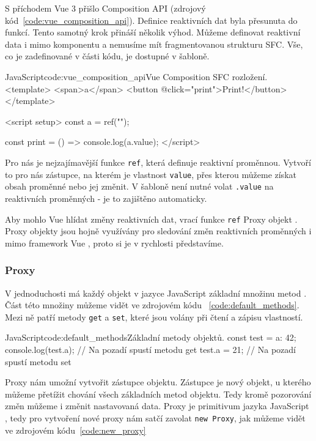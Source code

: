 \documentclass[
  master,
  program=ainf,
  tables=false,
  sourcecodes,
  glossaries,
  index
]{kidiplom}
\begin{document}
S příchodem Vue 3 \cite{vue} přišlo Composition API (zdrojový kód~\ref{code:vue_composition_api}). 
Definice reaktivních dat byla přesunuta do funkcí. Tento samotný krok přináší několik výhod. Můžeme 
definovat reaktivní data i mimo komponentu a nemusíme mít fragmentovanou strukturu SFC. Vše, co je
zadefinované v části kódu, je dostupné v šabloně. 


  \begin{kicode}{JavaScript}{code:vue_composition_api}{Vue Composition SFC rozložení.}
    <template>
      <span>{{a}}</span>
      <button @click="print">Print!</button>
    </template>
  
    <script setup>
      const a = ref("");
  
      const print = () => {
        console.log(a.value);
      }
    </script>
  \end{kicode}
  
Pro nás je nejzajímavější funkce {\tt ref}, která definuje reaktivní proměnnou.
Vytvoří to pro nás zástupce, na kterém je vlastnost {\tt value}, přes kterou můžeme
získat obsah proměnné nebo jej změnit. V šabloně není nutné volat {\tt .value} na
reaktivních proměnných - je to zajištěno automaticky.

Aby mohlo Vue \cite{vue} hlídat změny reaktivních dat, vrací funkce {\tt ref} Proxy objekt \cite{proxy}. Proxy
objekty \cite{proxy} jsou hojně využívány pro sledování změn reaktivních proměnných i mimo framework
Vue \cite{vue}, proto si je v rychlosti představíme.

\subsubsection{Proxy}

V jednoduchosti má každý objekt v jazyce JavaScript \cite{js} základní množinu metod \cite{default_methods}. Část této množiny můžeme vidět
ve zdrojovém kódu ~\ref{code:default_methods}.
Mezi ně patří metody {\tt get} a {\tt set}, které jsou volány při čtení a zápisu vlastností.

\begin{kicode}{JavaScript}{code:default_methods}{Základní metody objektů.}
  const test = {a: 42};
  console.log(test.a); // Na pozadí spustí metodu get
  test.a = 21; // Na pozadí spustí metodu set
\end{kicode}

Proxy nám umožní vytvořit zástupce objektu. Zástupce je nový objekt, u kterého
můžeme přetížit chování všech základních metod objektu. Tedy kromě pozorování 
změn můžeme i změnit nastavovaná data. Proxy je primitivum jazyka JavaScript \cite{js}, tedy
pro vytvoření nové proxy nám satčí zavolat {\tt new Proxy}, jak můžeme vidět ve zdrojovém kódu~\ref{code:new_proxy}
\end{document}
